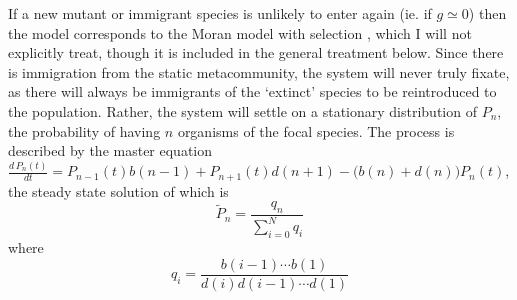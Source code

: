 If a new mutant or immigrant species is unlikely to enter again (ie. if $g\simeq 0$) then the model corresponds to the Moran model with selection \cite{Taylor2004,Claussen2005,Lambert2006,Blythe2007,Parsons2007,Pigolotti2013,Chalub2016,Czuppon2017}, which I will not explicitly treat, though it is included in the general treatment below. %
Since there is immigration from the static metacommunity, the system will never truly fixate, as there will always be immigrants of the `extinct' species to be reintroduced to the population.  
Rather, the system will settle on a stationary distribution of $P_n$, the probability of having $n$ organisms of the focal species. 
The process is described by the master equation $\frac{d\,P_n(t)}{dt} = P_{n-1}(t)b(n-1) + P_{n+1}(t)d(n+1) - \big(b(n)+d(n)\big)P_n(t)$, the steady state solution of which is \cite{Nisbet1982}
\begin{equation}
\widetilde{P}_n = \frac{q_n}{\sum_{i=0}^N q_i}
 \label{steadystateprobdistr}
\end{equation}
where
\begin{equation*}
q_i = \frac{b(i-1)\cdots b(1)}{d(i)d(i-1)\cdots d(1)}
\end{equation*}

